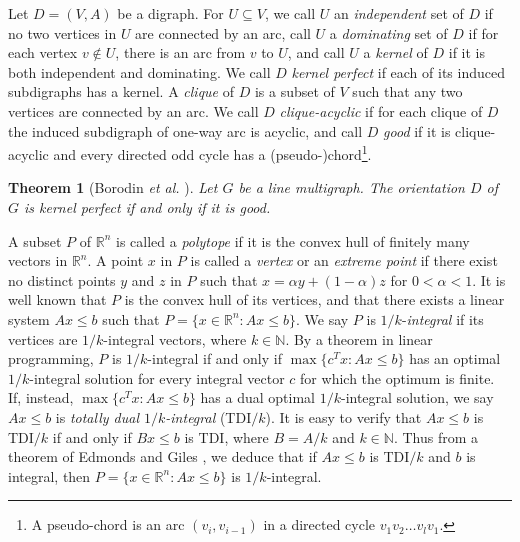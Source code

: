 \documentclass[11pt]{article}
\newtheorem{theorem}{Theorem}%
\numberwithin{theorem}{section}
\begin{document}
Let $D=(V,A)$ be a digraph.
For $U\subseteq V$, we call $U$ an \textit{independent} set of $D$ if no two vertices in $U$ are connected by an arc, call $U$ a \textit{dominating} set of $D$ if for each vertex $v\not\in U$, there is an arc from $v$ to $U$, and call $U$ a \textit{kernel} of $D$ if it is both independent and dominating.
We call $D$ \textit{kernel perfect} if each of its induced subdigraphs has a kernel.
A \textit{clique} of $D$ is a subset of $V$ such that any two vertices are connected by an arc. We call $D$ \textit{clique-acyclic} if for each clique of $D$ the induced subdigraph of one-way arc is acyclic, and call $D$ \textit{good} if it is clique-acyclic and every directed odd cycle has a (pseudo-)chord\footnote{A pseudo-chord is an arc $(v_i,v_{i-1})$ in a directed cycle $v_1 v_2\ldots v_l v_1$.}.

\begin{theorem}[Borodin \textit{et al.} \cite{BoroKost98}]
\label{thm:BoroKost98}
Let $G$ be a line multigraph. The orientation $D$ of $G$ is kernel perfect if and only if it is good.
\end{theorem}

A subset $P$ of $\mathbb{R}^n$ is called a \textit{polytope} if it is the convex hull of finitely many vectors in $\mathbb{R}^n$. A point $x$ in $P$ is called a \textit{vertex} or an \textit{extreme point} if there exist no distinct points $y$ and $z$ in $P$ such that $x=\alpha y+ (1-\alpha)z$ for $0<\alpha<1$. It is well known that $P$ is the convex hull of its vertices, and that there exists a linear system $Ax\leq b$ such that $P=\{x\in\mathbb{R}^n:Ax\leq b\}$.
We say $P$ is $1/k$-\textit{integral} if its vertices are $1/k$-integral vectors, where $k\in\mathbb{N}$. By a theorem in linear programming, $P$ is $1/k$-integral if and only if $\max\{c^T x:Ax\leq b\}$ has an optimal $1/k$-integral solution for every integral vector $c$ for which the optimum is finite. If, instead, $\max\{c^T x:Ax\leq b\}$ has a dual optimal $1/k$-integral solution, we say $Ax\leq b$ is \textit{totally dual $1/k$-integral} (TDI$/k$).
It is easy to verify that $Ax\leq b$ is TDI$/k$ if and only if $Bx\leq b$ is TDI, where $B=A/k$ and $k\in\mathbb{N}$. Thus from a theorem of Edmonds and Giles \cite{EdmoGile77}, we deduce that if $Ax\leq b$ is TDI$/k$ and $b$ is integral, then $P=\{x\in\mathbb{R}^n:Ax\leq b\}$ is $1/k$-integral.
\end{document}
